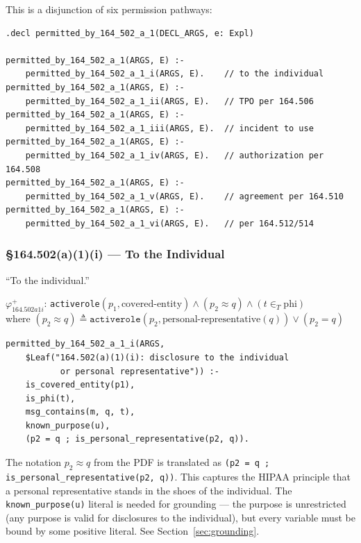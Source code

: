 \documentclass[11pt,letterpaper]{article}
\begin{document}
This is a disjunction of six permission pathways:

\begin{lstlisting}[style=soufflestyle,caption={\S 164.502(a)(1) --- six pathways}]
.decl permitted_by_164_502_a_1(DECL_ARGS, e: Expl)

permitted_by_164_502_a_1(ARGS, E) :-
    permitted_by_164_502_a_1_i(ARGS, E).    // to the individual
permitted_by_164_502_a_1(ARGS, E) :-
    permitted_by_164_502_a_1_ii(ARGS, E).   // TPO per 164.506
permitted_by_164_502_a_1(ARGS, E) :-
    permitted_by_164_502_a_1_iii(ARGS, E).  // incident to use
permitted_by_164_502_a_1(ARGS, E) :-
    permitted_by_164_502_a_1_iv(ARGS, E).   // authorization per 164.508
permitted_by_164_502_a_1(ARGS, E) :-
    permitted_by_164_502_a_1_v(ARGS, E).    // agreement per 164.510
permitted_by_164_502_a_1(ARGS, E) :-
    permitted_by_164_502_a_1_vi(ARGS, E).   // per 164.512/514
\end{lstlisting}

\subsubsection{\S 164.502(a)(1)(i) --- To the Individual}
\label{sec:502a1i}

\begin{hipaabox}
``To the individual.''
\end{hipaabox}

\begin{pdfbox}
$\varphi^+_{164.502a1i}$: \texttt{activerole}$(p_1, \text{covered-entity}) \wedge (p_2 \approx q) \wedge (t \in_T \text{phi})$\\
where $(p_2 \approx q) \triangleq \texttt{activerole}(p_2, \text{personal-representative}(q)) \vee (p_2 = q)$
\end{pdfbox}

\begin{lstlisting}[style=soufflestyle,caption={\S 164.502(a)(1)(i) --- disclosure to individual}]
permitted_by_164_502_a_1_i(ARGS,
    $Leaf("164.502(a)(1)(i): disclosure to the individual
           or personal representative")) :-
    is_covered_entity(p1),
    is_phi(t),
    msg_contains(m, q, t),
    known_purpose(u),
    (p2 = q ; is_personal_representative(p2, q)).
\end{lstlisting}

\begin{designbox}
The notation $p_2 \approx q$ from the PDF is translated as \texttt{(p2 = q ; is\_personal\_representative(p2, q))}. This captures the HIPAA principle that a personal representative stands in the shoes of the individual. The \texttt{known\_purpose(u)} literal is needed for grounding --- the purpose is unrestricted (any purpose is valid for disclosures to the individual), but every variable must be bound by some positive literal. See Section~\ref{sec:grounding}.
\end{designbox}
\end{document}
